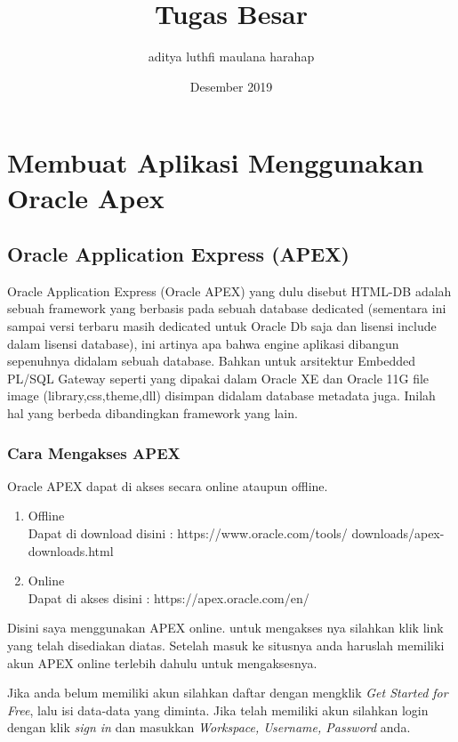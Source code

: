 \documentclass[12pt, times new roman, a4paper]{report}
\title{Tugas Besar}
\author{aditya luthfi maulana harahap }
\date{Desember 2019}
\begin{document}
\maketitle
\chapter{Membuat Aplikasi Menggunakan Oracle Apex}

\section{Oracle Application Express (APEX)}

\hspace{1cm} Oracle Application Express (Oracle APEX) yang dulu disebut HTML-DB adalah sebuah framework yang berbasis pada sebuah database dedicated (sementara ini sampai versi terbaru masih dedicated untuk Oracle Db saja dan lisensi include dalam lisensi database), ini artinya apa bahwa engine aplikasi dibangun sepenuhnya didalam sebuah database. Bahkan untuk arsitektur Embedded PL/SQL Gateway seperti yang dipakai dalam Oracle XE dan Oracle 11G file image (library,css,theme,dll) disimpan didalam database metadata juga. Inilah hal yang berbeda dibandingkan framework yang lain.

\subsection{Cara Mengakses APEX}
\hspace{1cm} Oracle APEX dapat di akses secara online ataupun offline.

\begin{enumerate}
\item Offline\\
	\hspace{1cm} Dapat di download disini 	: https://www.oracle.com/tools/	   downloads/apex-downloads.html
\item Online\\
	\hspace{1cm} Dapat di akses disini : https://apex.oracle.com/en/
\end{enumerate}

\par Disini saya menggunakan APEX online. untuk mengakses nya silahkan klik link yang telah disediakan diatas. Setelah masuk ke situsnya anda haruslah memiliki akun APEX online terlebih dahulu untuk mengaksesnya.\\
\par Jika anda belum memiliki akun silahkan daftar dengan mengklik \textit{Get Started for Free}, lalu isi data-data yang diminta. Jika telah memiliki akun silahkan login dengan klik \textit{sign in} dan masukkan \textit{Workspace, Username, Password} anda.
\end{document}
